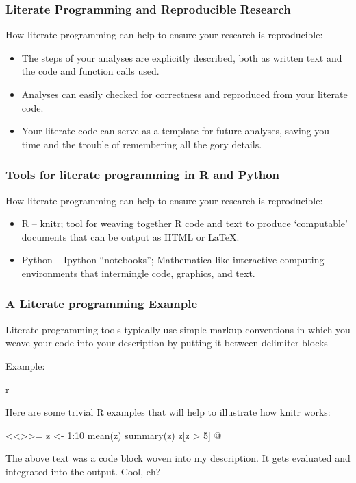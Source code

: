 \documentclass{beamer}
\begin{document}
\begin{frame}
  \frametitle{Literate Programming and Reproducible Research}

How literate programming can help to ensure your research is reproducible:

\begin{itemize}

 \item The steps of your analyses are explicitly described, both as written text and the code and function calls used.
 \item Analyses can easily checked for correctness and reproduced from your literate code.
 \item Your literate code can serve as a template for future analyses, saving you time and the trouble of remembering all the gory details.
\end{itemize}

\end{frame}

\begin{frame}
  \frametitle{Tools for literate programming in R and Python}

How literate programming can help to ensure your research is reproducible:

\begin{itemize}
 \item R -- knitr; tool for weaving together R code and text to produce `computable' documents that can be output as HTML or \LaTeX.
 \item Python -- Ipython ``notebooks''; Mathematica like interactive computing environments that intermingle code, graphics, and text.
\end{itemize}

\end{frame}

\begin{frame}[fragile]
  \frametitle{A Literate programming Example}

Literate programming tools typically use simple markup conventions in which you weave your code into your description by putting it between delimiter blocks

\smallskip
Example:

\begin{Code}{r}

Here are some trivial R examples that will help to
illustrate how knitr works:

<<>>=
z <- 1:10
mean(z)
summary(z)
z[z > 5]
@

The above text was a code block woven into my 
description. It gets evaluated and integrated into 
the output. Cool, eh?    
\end{Code}


\end{frame}
\end{document}
